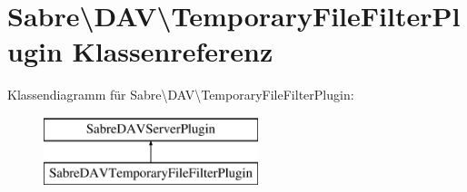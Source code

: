 \hypertarget{class_sabre_1_1_d_a_v_1_1_temporary_file_filter_plugin}{}\section{Sabre\textbackslash{}D\+AV\textbackslash{}Temporary\+File\+Filter\+Plugin Klassenreferenz}
\label{class_sabre_1_1_d_a_v_1_1_temporary_file_filter_plugin}
Klassendiagramm für Sabre\textbackslash{}D\+AV\textbackslash{}Temporary\+File\+Filter\+Plugin\+:\begin{figure}[H]
\begin{center}
\leavevmode
\includegraphics[height=2.000000cm]{class_sabre_1_1_d_a_v_1_1_temporary_file_filter_plugin}
\end{center}
\end{figure}
